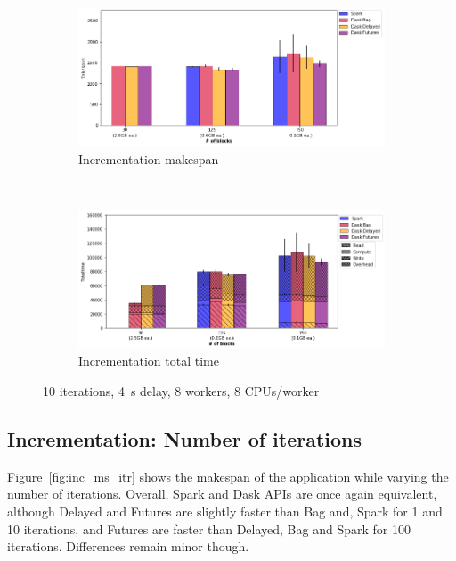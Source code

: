 \documentclass[conference]{IEEEtran}
\begin{document}
\begin{figure}[!t]
    \centering
    \begin{subfigure}[b]{\columnwidth}
        \includegraphics[clip,width=\columnwidth]{images/inc_block.png}%
        \caption{Incrementation makespan}\label{fig:inc_ms_block}
    \end{subfigure}
    \\
    \begin{subfigure}[b]{\columnwidth}
        \includegraphics[clip,width=\columnwidth]{images/inc_idle_block.png}%
        \caption{Incrementation total time}\label{fig:inc_tt_block}
    \end{subfigure}
    \caption{10 iterations, \SI{4}{\second} delay, 8 workers, 8
    CPUs/worker}\label{fig:inc_block}
\end{figure}

\subsection{Incrementation: Number of iterations}
Figure~\ref{fig:inc_ms_itr} shows the makespan of the application while
varying the number of iterations. Overall, Spark and Dask APIs are once
again equivalent, although Delayed and Futures are slightly faster
than Bag and, Spark for 1 and 10 iterations, and Futures are faster than
Delayed, Bag and Spark for 100 iterations. Differences remain minor
though.
\end{document}
